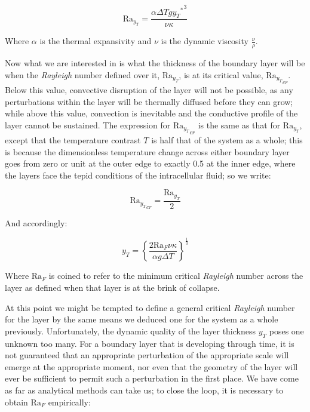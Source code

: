 \documentclass[a4paper,11pt,oneside]{book}
\begin{document}
\begin{equation}
\mathrm{Ra}_{y_T} = \frac{\alpha \Delta T g {{y_T}^*}^3}{\nu \kappa}
\end{equation}

Where $\alpha$ is the thermal expansivity and $\nu$ is the dynamic viscosity $\frac{\nu}{\rho}$.

Now what we are interested in is what the thickness of the boundary layer will be when the \textit{Rayleigh} number defined over it, $\mathrm{Ra}_{y_T}$, is at its critical value, ${\mathrm{Ra}_{y_T}}_{cr}$. Below this value, convective disruption of the layer will not be possible, as any perturbations within the layer will be thermally diffused before they can grow; while above this value, convection is inevitable and the conductive profile of the layer cannot be sustained. The expression for ${\mathrm{Ra}_{y_T}}_{cr}$ is the same as that for $\mathrm{Ra}_{y_T}$, except that the temperature contrast $T$ is half that of the system as a whole; this is because the dimensionless temperature change across either boundary layer goes from zero or unit at the outer edge to exactly 0.5 at the inner edge, where the layers face the tepid conditions of the intracellular fluid; so we write:

\begin{equation}
{\mathrm{Ra}_{y_T}}_{cr} = \frac{\mathrm{Ra}_{y_T}}{2}
\end{equation}

And accordingly:

\begin{equation}
y_T = \left\{ \frac{2 \mathrm{Ra}_F \nu \kappa}{\alpha g \Delta T} \right\} ^{\frac{1}{3}}
\end{equation}

Where $\mathrm{Ra}_F$ is coined to refer to the minimum critical \textit{Rayleigh} number across the layer as defined when that layer is at the brink of collapse.

At this point we might be tempted to define a general critical \textit{Rayleigh} number for the layer by the same means we deduced one for the system as a whole previously. Unfortunately, the dynamic quality of the layer thickness $y_T$ poses one unknown too many. For a boundary layer that is developing through time, it is not guaranteed that an appropriate perturbation of the appropriate scale will emerge at the appropriate moment, nor even that the geometry of the layer will ever be sufficient to permit such a perturbation in the first place. We have come as far as analytical methods can take us; to close the loop, it is necessary to obtain $\mathrm{Ra}_F$ empirically:
\end{document}
